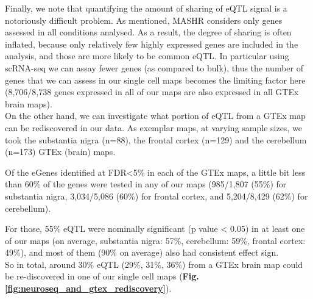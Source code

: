Finally, we note that quantifying the amount of sharing of eQTL signal is a notoriously difficult problem.
As mentioned, MASHR considers only genes assessed in all conditions analysed. 
As a result, the degree of sharing is often inflated, because only relatively few highly expressed genes are included in the analysis, and those are more likely to be common eQTL. 
In particular using scRNA-seq we can assay fewer genes (as compared to bulk), thus the number of genes that we can assess in our single cell maps becomes the limiting factor here (8,706/8,738 genes expressed in all of our maps are also expressed in all GTEx brain maps).\\


On the other hand,
we can investigate what portion of eQTL from a GTEx map can be rediscovered in our data.
As exemplar maps, at varying sample sizes, we took the substantia nigra (n=88), the frontal cortex (n=129) and the cerebellum (n=173) GTEx (brain) maps.

Of the eGenes identified at FDR<5\% in each of the GTEx maps, a little bit less than 60\% of the genes were tested in any of our maps 
(985/1,807 (55\%) for substantia nigra,
3,034/5,086 (60\%) for frontal cortex, 
and 5,204/8,429 (62\%) for cerebellum).

For those, 55\% eQTL were nominally significant (p value < 0.05) in at least one of our maps (on average, substantia nigra: 57\%, cerebellum: 59\%, frontal cortex: 49\%), 
and most of them
(90\% on average) also had consistent effect sign. \\

So in total, around 30\% eQTL (29\%, 31\%, 36\%)
from a GTEx brain map could be re-discovered in one of our single cell maps (\textbf{Fig. \ref{fig:neuroseq_and_gtex_rediscovery}}).

